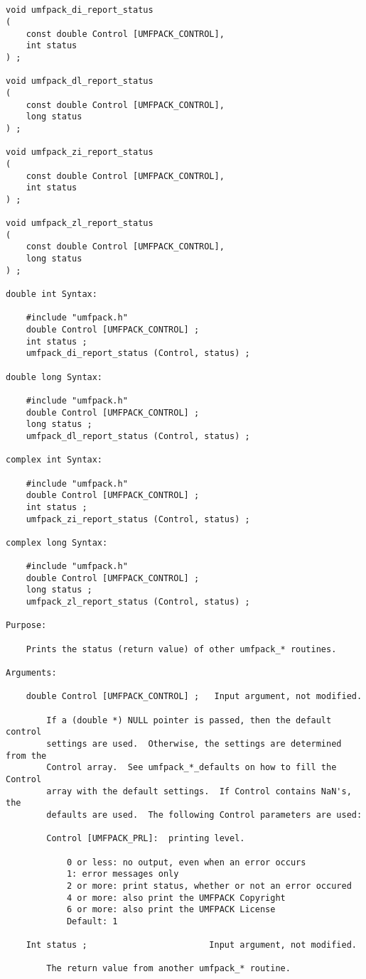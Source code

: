 {\footnotesize
\begin{verbatim}


void umfpack_di_report_status
(
    const double Control [UMFPACK_CONTROL],
    int status
) ;

void umfpack_dl_report_status
(
    const double Control [UMFPACK_CONTROL],
    long status
) ;

void umfpack_zi_report_status
(
    const double Control [UMFPACK_CONTROL],
    int status
) ;

void umfpack_zl_report_status
(
    const double Control [UMFPACK_CONTROL],
    long status
) ;

double int Syntax:

    #include "umfpack.h"
    double Control [UMFPACK_CONTROL] ;
    int status ;
    umfpack_di_report_status (Control, status) ;

double long Syntax:

    #include "umfpack.h"
    double Control [UMFPACK_CONTROL] ;
    long status ;
    umfpack_dl_report_status (Control, status) ;

complex int Syntax:

    #include "umfpack.h"
    double Control [UMFPACK_CONTROL] ;
    int status ;
    umfpack_zi_report_status (Control, status) ;

complex long Syntax:

    #include "umfpack.h"
    double Control [UMFPACK_CONTROL] ;
    long status ;
    umfpack_zl_report_status (Control, status) ;

Purpose:

    Prints the status (return value) of other umfpack_* routines.

Arguments:

    double Control [UMFPACK_CONTROL] ;   Input argument, not modified.

        If a (double *) NULL pointer is passed, then the default control
        settings are used.  Otherwise, the settings are determined from the
        Control array.  See umfpack_*_defaults on how to fill the Control
        array with the default settings.  If Control contains NaN's, the
        defaults are used.  The following Control parameters are used:

        Control [UMFPACK_PRL]:  printing level.

            0 or less: no output, even when an error occurs
            1: error messages only
            2 or more: print status, whether or not an error occured
            4 or more: also print the UMFPACK Copyright
            6 or more: also print the UMFPACK License
            Default: 1

    Int status ;                        Input argument, not modified.

        The return value from another umfpack_* routine.
\end{verbatim}
}

